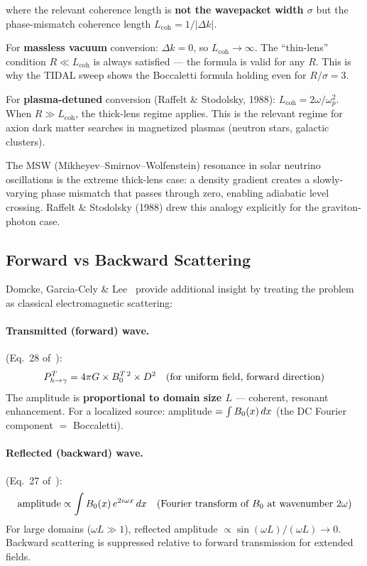 \noindent where the relevant coherence length is \textbf{not the wavepacket width $\sigma$} but the phase-mismatch
coherence length $L_\text{coh} = 1/|\Delta k|$.

For \textbf{massless vacuum} conversion: $\Delta k = 0$, so $L_\text{coh} \to \infty$. The ``thin-lens'' condition
$R \ll L_\text{coh}$ is always satisfied --- the formula is valid for any $R$. This is why the TIDAL
sweep shows the Boccaletti formula holding even for $R/\sigma = 3$.

For \textbf{plasma-detuned} conversion (Raffelt \& Stodolsky, 1988): $L_\text{coh} = 2\omega/\omega_p^2$. When
$R \gg L_\text{coh}$, the thick-lens regime applies. This is the relevant regime for axion dark matter
searches in magnetized plasmas (neutron stars, galactic clusters).

The MSW (Mikheyev--Smirnov--Wolfenstein) resonance in solar neutrino oscillations is the
extreme thick-lens case: a density gradient creates a slowly-varying phase mismatch that
passes through zero, enabling adiabatic level crossing. Raffelt \& Stodolsky (1988) drew
this analogy explicitly for the graviton-photon case.


\subsection{Forward vs Backward Scattering}
\label{sec:forward-backward}

Domcke, Garcia-Cely \& Lee~\cite{domcke2025scattering} provide additional insight by treating
the problem as classical electromagnetic scattering:

\paragraph{Transmitted (forward) wave.}
\label{par:forward}
(Eq.~28 of~\cite{domcke2025scattering}):
\begin{equation}
  P_{h \to \gamma}^T = 4\pi G \times B_0^{T\,2} \times D^2 \quad (\text{for uniform field, forward direction})
\end{equation}
The amplitude is \textbf{proportional to domain size $L$} --- coherent, resonant enhancement.
For a localized source: amplitude $= \int B_0(x)\, dx$ (the DC Fourier component $=$ Boccaletti).

\paragraph{Reflected (backward) wave.}
\label{par:backward}
(Eq.~27 of~\cite{domcke2025scattering}):
\begin{equation}
  \text{amplitude} \propto \int B_0(x)\, e^{2i\omega x}\, dx \quad (\text{Fourier transform of } B_0 \text{ at wavenumber } 2\omega)
\end{equation}
For large domains ($\omega L \gg 1$), reflected amplitude $\propto \sin(\omega L)/(\omega L) \to 0$. Backward scattering
is suppressed relative to forward transmission for extended fields.

